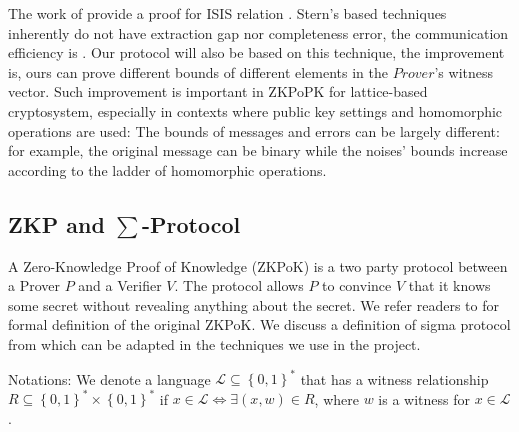 \begin{description}
  The work of \cite{ling2013improved} provide a proof for ISIS relation
  .  Stern's based techniques inherently do not have
  extraction gap nor completeness error, the communication efficiency is
  . Our protocol will also be based on this technique, the
  improvement is, ours can prove different bounds of different elements in the
  $Prover$'s witness vector. Such improvement is important in ZKPoPK for
  lattice-based cryptosystem, especially in contexts where public key settings
  and homomorphic operations are used: The bounds of messages and errors can be
  largely different: for example, the original message can be binary while the
  noises' bounds increase according to the ladder of homomorphic operations.

\end{description}


\subsection{ZKP and $\sum$-Protocol}
\label{sub:zkp_and_sum_protocol}
A Zero-Knowledge Proof of Knowledge (ZKPoK) is a two party protocol between a
Prover $P$ and a Verifier $V$. The protocol allows $P$ to convince $V$ that it
knows some secret without revealing anything about the secret. We refer readers
to \cite{bellare1992defining} for formal definition of the original ZKPoK. We
discuss a definition of sigma protocol from \cite{benhamouda2014better} which
can be adapted in the techniques we use in the project.

Notations: We denote a language $\mathcal{L} \subseteq \left\{ 0,1 \right\}^* $
that has a witness relationship $R \subseteq \left\{ 0,1 \right\}^* \times \left\{
  0,1 \right\}^*$ if $x \in \mathcal{L} \iff \exists (x,w) \in R$, where
$w$ is a witness for $x \in \mathcal{L}$.

